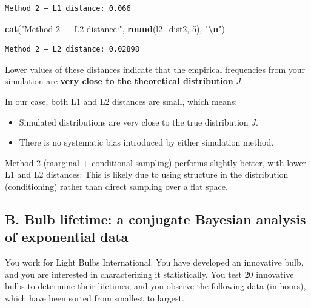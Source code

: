 \documentclass[
]{article}
\newenvironment{Shaded}{\begin{snugshade}}{\end{snugshade}}
\newcommand{\DecValTok}[1]{\textcolor[rgb]{0.00,0.00,0.81}{#1}}
\newcommand{\FunctionTok}[1]{\textcolor[rgb]{0.13,0.29,0.53}{\textbf{#1}}}
\newcommand{\NormalTok}[1]{#1}
\newcommand{\SpecialCharTok}[1]{\textcolor[rgb]{0.81,0.36,0.00}{\textbf{#1}}}
\newcommand{\StringTok}[1]{\textcolor[rgb]{0.31,0.60,0.02}{#1}}
\begin{document}
\begin{verbatim}
Method 2 — L1 distance: 0.066 
\end{verbatim}

\begin{Shaded}
\begin{Highlighting}[]
\FunctionTok{cat}\NormalTok{(}\StringTok{"Method 2 — L2 distance:"}\NormalTok{, }\FunctionTok{round}\NormalTok{(l2\_dist2, }\DecValTok{5}\NormalTok{), }\StringTok{"}\SpecialCharTok{\textbackslash{}n}\StringTok{"}\NormalTok{)}
\end{Highlighting}
\end{Shaded}

\begin{verbatim}
Method 2 — L2 distance: 0.02898 
\end{verbatim}

Lower values of these distances indicate that the empirical frequencies
from your simulation are \textbf{very close to the theoretical
distribution} \(J\).

In our case, both L1 and L2 distances are small, which means:

\begin{itemize}
\item
  Simulated distributions are very close to the true distribution \(J\).
\item
  There is no systematic bias introduced by either simulation method.
\end{itemize}

Method 2 (marginal + conditional sampling) performs slightly better,
with lower L1 and L2 distances: This is likely due to using structure in
the distribution (conditioning) rather than direct sampling over a flat
space.

\bigskip

\newpage

\subsection{B. Bulb lifetime: a conjugate Bayesian analysis of
exponential
data}\label{b.-bulb-lifetime-a-conjugate-bayesian-analysis-of-exponential-data}

You work for Light Bulbs International. You have developed an innovative
bulb, and you are interested in characterizing it statistically. You
test 20 innovative bulbs to determine their lifetimes, and you observe
the following data (in hours), which have been sorted from smallest to
largest.
\end{document}
